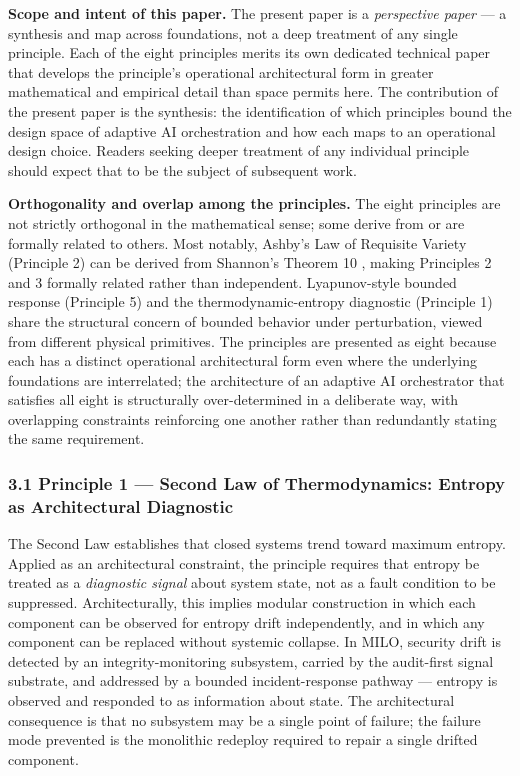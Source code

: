 \textbf{Scope and intent of this paper.} The present paper is a
\emph{perspective paper} --- a synthesis and map across foundations, not
a deep treatment of any single principle. Each of the eight principles
merits its own dedicated technical paper that develops the principle's
operational architectural form in greater mathematical and empirical
detail than space permits here. The contribution of the present paper is
the synthesis: the identification of which principles bound the design
space of adaptive AI orchestration and how each maps to an operational
design choice. Readers seeking deeper treatment of any individual
principle should expect that to be the subject of subsequent work.

\textbf{Orthogonality and overlap among the principles.} The eight
principles are not strictly orthogonal in the mathematical sense; some
derive from or are formally related to others. Most notably, Ashby's Law
of Requisite Variety (Principle 2) can be derived from Shannon's Theorem
10 \cite{ref7}, making Principles 2 and 3 formally related rather than
independent. Lyapunov-style bounded response (Principle 5) and the
thermodynamic-entropy diagnostic (Principle 1) share the structural
concern of bounded behavior under perturbation, viewed from different
physical primitives. The principles are presented as eight because each
has a distinct operational architectural form even where the underlying
foundations are interrelated; the architecture of an adaptive AI
orchestrator that satisfies all eight is structurally over-determined in
a deliberate way, with overlapping constraints reinforcing one another
rather than redundantly stating the same requirement.

\subsubsection{3.1 Principle 1 --- Second Law of Thermodynamics: Entropy
as Architectural
Diagnostic}\label{principle-1-second-law-of-thermodynamics-entropy-as-architectural-diagnostic}

The Second Law establishes that closed systems trend toward maximum
entropy. Applied as an architectural constraint, the principle requires
that entropy be treated as a \emph{diagnostic signal} about system
state, not as a fault condition to be suppressed. Architecturally, this
implies modular construction in which each component can be observed for
entropy drift independently, and in which any component can be replaced
without systemic collapse. In MILO, security drift is detected by an
integrity-monitoring subsystem, carried by the audit-first signal
substrate, and addressed by a bounded incident-response pathway ---
entropy is observed and responded to as information about state. The
architectural consequence is that no subsystem may be a single point of
failure; the failure mode prevented is the monolithic redeploy required
to repair a single drifted component.

